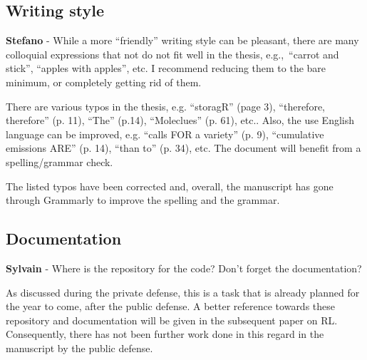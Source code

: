 \documentclass[12pt,a4paper]{article}
\def\eg{e.g.,\ }
\begin{document}
\subsection{Writing style}
\label{writing_style}

\begin{mdframed}[style=comment] %
{\color{orange} \textbf{Stefano}} - While a more ``friendly'' writing style can be pleasant, there are many colloquial expressions that not do not fit well in the thesis, \eg ``carrot and stick'', ``apples with apples'', etc. I recommend reducing them to the bare minimum, or completely getting rid of them. 
\end{mdframed}

\noindent

\begin{mdframed}[style=manuscript] %

\end{mdframed}

\begin{mdframed}[style=comment] %
There are various typos in the thesis, e.g. ``storagR'' (page 3), ``therefore, therefore'' (p. 11), ``The'' (p.14), ``Moleclues'' (p. 61), etc.. Also, the use English language can be improved, e.g. ``calls FOR a variety'' (p. 9), ``cumulative emissions ARE'' (p. 14), ``than to'' (p. 34), etc. The document will benefit from a spelling/grammar check.
\end{mdframed}

\noindent The listed typos have been corrected and, overall, the manuscript has gone through Grammarly to improve the spelling and the grammar.

\subsection{Documentation}
\label{documentation}

\begin{mdframed}[style=comment] %
{\color{purple} \textbf{Sylvain}} - Where is the repository for the code? Don't forget the documentation?
\end{mdframed}

\noindent As discussed during the private defense, this is a task that is already planned for the year to come, after the public defense. A better reference towards these repository and documentation will be given in the subsequent paper on RL. Consequently, there has not been further work done in this regard in the manuscript by the public defense.
\end{document}
